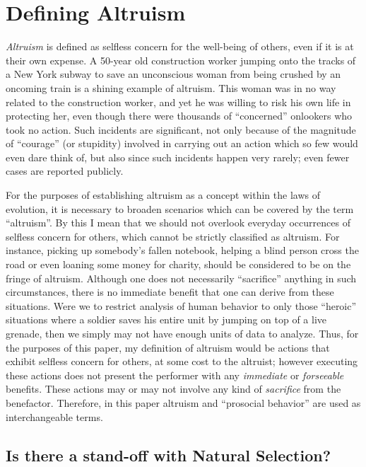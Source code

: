 \documentclass[12pt, letter]{article}
\begin{document}
\section*{Defining Altruism}
\emph{Altruism} is defined as selfless concern for the well-being of others, even if it is at their own expense. A 50-year old construction worker jumping onto the tracks of a New York subway to save an unconscious woman from being crushed by an oncoming train is a shining example of altruism. This woman was in no way related to the construction worker, and yet he was willing to risk his own life in protecting her, even though there were thousands of ``concerned'' onlookers who took no action. Such incidents are significant, not only because of the magnitude of ``courage'' (or stupidity) involved in carrying out an action which so few would even dare think of, but also since such incidents happen very rarely; even fewer cases are reported publicly.

For the purposes of establishing altruism as a concept within the laws of evolution, it is necessary to broaden scenarios which can be covered by the term ``altruism''. By this I mean that we should not overlook everyday occurrences of selfless concern for others, which cannot be strictly classified as altruism. For instance, picking up somebody's fallen notebook, helping a blind person cross the road or even loaning some money for charity, should be considered to be on the fringe of altruism. Although one does not necessarily ``sacrifice'' anything in such circumstances, there is no immediate benefit that one can derive from these situations. Were we to restrict analysis of human behavior to only those ``heroic'' situations where a soldier saves his entire unit by jumping on top of a live grenade, then we simply may not have enough units of data to analyze. Thus, for the purposes of this paper, my definition of altruism would be actions that exhibit selfless concern for others, at some cost to the altruist; however executing these actions does not present the performer with any \emph{immediate} or \emph{forseeable} benefits. These actions may or may not involve any kind of \emph{sacrifice} from the benefactor. Therefore, in this paper altruism and ``prosocial behavior'' are used as interchangeable terms.

\subsection*{Is there a stand-off with Natural Selection?}
\end{document}
